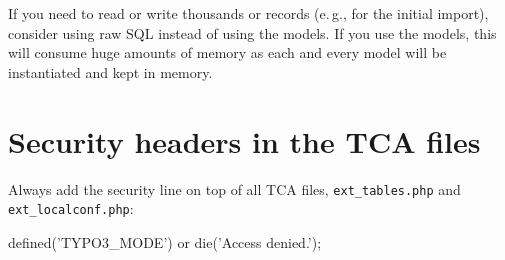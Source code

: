 If you need to read or write thousands or records (e.\,g., for the initial import), consider using raw SQL instead of using the models. If you use the models, this will consume huge amounts of memory as each and every model will be instantiated and kept in memory.


\section{Security headers in the TCA files}

Always add the security line on top of all TCA files, \texttt{ext\_tables.php} and \texttt{ext\_localconf.php}:

\begin{phpcode}
defined('TYPO3_MODE') or die('Access denied.');
\end{phpcode}


